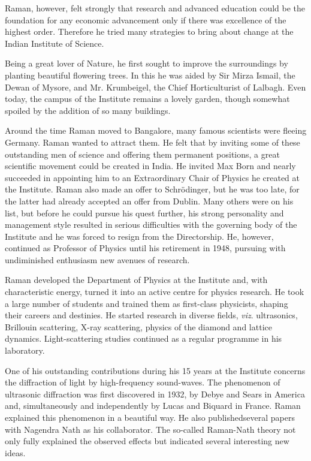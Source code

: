 Raman, however, felt strongly that research and advanced
education could be the foundation for any economic advancement
only if there was excellence of the highest order. Therefore he
tried many strategies to bring about change at the Indian Institute
of Science.

Being a great lover of Nature, he first sought to improve
the surroundings by planting beautiful flowering trees. In this
he was aided by Sir Mirza Ismail, the Dewan of Mysore, and
Mr. Krumbeigel, the Chief Horticulturist of Lalbagh. Even today,
the campus of the Institute remains a lovely garden, though
somewhat spoiled by the addition of so many buildings.

Around the time Raman moved to Bangalore, many famous
scientists were fleeing Germany. Raman wanted to attract them.
He felt that by inviting some of these outstanding men of science
and offering them permanent positions, a great scientific
movement could be created in India. He invited Max Born and
nearly succeeded in appointing him to an Extraordinary Chair
of Physics he created at the Institute. Raman also made an offer
to Schr\"odinger, but he was too late, for the latter had already
accepted an offer from Dublin. Many others were on his list, but
before he could pursue his quest further, his strong personality
and management style resulted in serious difficulties with the
governing body of the Institute and he was forced to resign from
the Directorship. He, however, continued as Professor of Physics
until his retirement in 1948, pursuing with undiminished
enthusiasm new avenues of research.

Raman developed the Department of Physics at the Institute
and, with characteristic energy, turned it into an active centre
for physics research. He took a large number of students and
trained them as first-class physicists, shaping their careers and
destinies. He started research in diverse fields, {\em viz}. ultrasonics,
Brillouin scattering, X-ray scattering, physics of the diamond and
lattice dynamics. Light-scattering studies continued as a regular
programme in his laboratory.

One of his outstanding contributions during his 15 years at
the Institute concerns the diffraction of light by high-frequency
sound-waves. The phenomenon of ultrasonic diffraction was first
discovered in 1932, by Debye and Sears in America and,
simultaneously and independently by Lucas and Biquard in
France. Raman explained this phenomenon in a beautiful way.
He also published\break \hbox{several} papers with Nagendra Nath as his
collaborator. The so-called Raman-Nath theory not only fully
explained the observed effects but indicated several interesting
new ideas.

